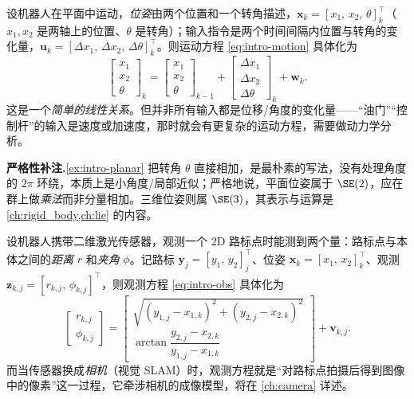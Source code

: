 \begin{example}\label{ex:intro-planar}
设机器人在平面中运动，\emph{位姿}由两个位置和一个转角描述，$\mathbf{x}_k=[x_1,\,x_2,\,\theta]_k^\top$（$x_1,x_2$ 是两轴上的位置、$\theta$ 是转角）；输入指令是两个时间间隔内位置与转角的变化量，$\mathbf{u}_k=[\Delta x_1,\,\Delta x_2,\,\Delta\theta]_k^\top$。则运动方程 \cref{eq:intro-motion} 具体化为
\begin{equation}
  \begin{bmatrix} x_1\\ x_2\\ \theta \end{bmatrix}_{k}
  =\begin{bmatrix} x_1\\ x_2\\ \theta \end{bmatrix}_{k-1}
  +\begin{bmatrix} \Delta x_1\\ \Delta x_2\\ \Delta\theta \end{bmatrix}_{k}
  +\mathbf{w}_k.
  \label{eq:intro-planar-motion}
\end{equation}
这是一个\emph{简单的线性关系}。但并非所有输入都是位移/角度的变化量——“油门”“控制杆”的输入是速度或加速度，那时就会有更复杂的运动方程，需要做动力学分析。
\end{example}

\begin{note}
\textbf{严格性补注.}\;\cref{ex:intro-planar} 把转角 $\theta$ 直接相加，是最朴素的写法，没有处理角度的 $2\pi$ 环绕，本质上是小角度/局部近似；严格地说，平面位姿属于 $\SE(2)$，应在群上做\emph{乘法}而非分量相加。三维位姿则属 $\SE(3)$，其表示与运算是 \cref{ch:rigid_body,ch:lie} 的内容。
\end{note}

\begin{example}[二维激光观测一个 2D 路标]\label{ex:intro-laser}
设机器人携带二维激光传感器，观测一个 2D 路标点时能测到两个量：路标点与本体之间的\emph{距离} $r$ 和\emph{夹角} $\phi$。记路标 $\mathbf{y}_j=[y_1,\,y_2]_j^\top$、位姿 $\mathbf{x}_k=[x_1,\,x_2]_k^\top$、观测 $\mathbf{z}_{k,j}=[r_{k,j},\,\phi_{k,j}]^\top$，则观测方程 \cref{eq:intro-obs} 具体化为
\begin{equation}
  \begin{bmatrix} r_{k,j}\\[2pt] \phi_{k,j} \end{bmatrix}
  =\begin{bmatrix}
     \sqrt{(y_{1,j}-x_{1,k})^2+(y_{2,j}-x_{2,k})^2}\\[4pt]
     \arctan\dfrac{y_{2,j}-x_{2,k}}{y_{1,j}-x_{1,k}}
   \end{bmatrix}+\mathbf{v}_{k,j}.
  \label{eq:intro-laser-obs}
\end{equation}
而当传感器换成\emph{相机}（视觉 SLAM）时，观测方程就是“对路标点拍摄后得到图像中的像素”这一过程，它牵涉相机的成像模型，将在 \cref{ch:camera} 详述。
\end{example}

